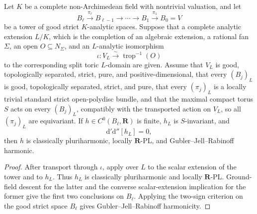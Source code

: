 \begin{corollary}
\label{cor:p062-iterated-algebraic-split-invariant-toric-open-polydisc-bundles}
Let \(K\) be a complete non-Archimedean field with nontrivial valuation, and
let
\[
 B_\ell\xrightarrow{\pi_\ell}B_{\ell-1}
 \longrightarrow\cdots\longrightarrow B_1
 \xrightarrow{\pi_1}B_0=V
\]
be a tower of good strict \(K\)-analytic spaces.  Suppose that a complete
analytic extension \(L/K\), which is the completion of an algebraic
extension, a rational fan \(\Sigma\), an open \(O\subseteq N_\Sigma\), and
an \(L\)-analytic isomorphism
\[
                 \iota:V_L\xrightarrow{\sim}\operatorname{trop}^{-1}(O)
\]
to the corresponding split toric \(L\)-domain are given.  Assume that
\(V_L\) is good, topologically separated, strict, pure, and
positive-dimensional, that every \((B_j)_L\) is good, topologically
separated, strict, and pure, that every
\((\pi_j)_L\) is a locally trivial standard strict open-polydisc bundle, and
that the maximal compact torus \(S\) acts on every \((B_j)_L\), compatibly
with the transported action on \(V_L\), so all \((\pi_j)_L\) are
equivariant.  If \(h\in C^0(B_\ell,\mathbf R)\) is finite, \(h_L\) is
\(S\)-invariant, and
\[
                         \mathrm d'\mathrm d''[h_L]=0,
\]
then \(h\) is classically pluriharmonic, locally \(\mathbf R\)-PL, and
Gubler--Jell--Rabinoff harmonic.
\end{corollary}

\begin{proof}
After transport through \(\iota\), apply
 over \(L\)
to the scalar extension of the tower and to \(h_L\).  Thus \(h_L\) is
classically pluriharmonic and locally \(\mathbf R\)-PL.  Ground-field
descent for the latter \cite[Corollary~5.12]{GJR26} and the converse
scalar-extension implication for the former
\cite[Proposition~7.2(6)]{GR25Classical} give the first two conclusions on
\(B_\ell\).  Applying the two-sign criterion on the good strict space
\(B_\ell\) gives Gubler--Jell--Rabinoff harmonicity.
\end{proof}

